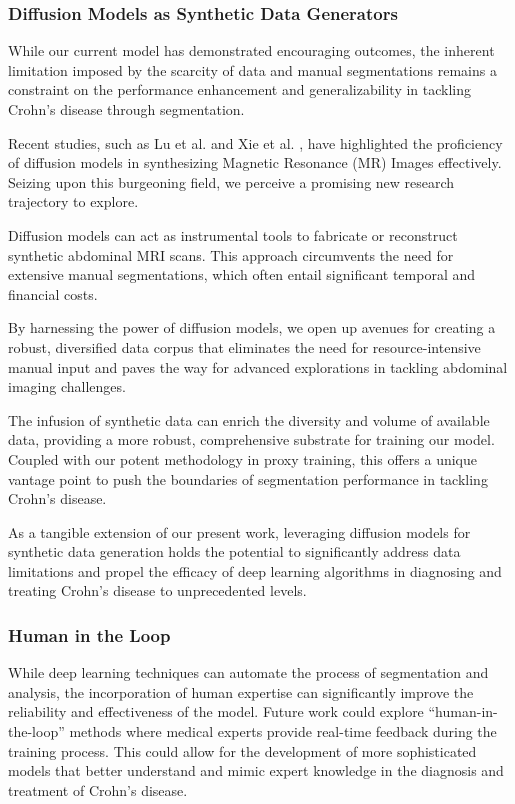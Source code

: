 \subsubsection*{Diffusion Models as Synthetic Data Generators}
While our current model has demonstrated encouraging outcomes, the inherent limitation imposed by the scarcity of data and manual segmentations remains a constraint on the performance enhancement and generalizability in tackling Crohn's disease through segmentation.

Recent studies, such as Lu et al. \cite{lu2023minddiffuser} and Xie et al. \cite{xie2023synthesizing}, have highlighted the proficiency of diffusion models in synthesizing Magnetic Resonance (MR) Images effectively. Seizing upon this burgeoning field, we perceive a promising new research trajectory to explore.

Diffusion models can act as instrumental tools to fabricate or reconstruct synthetic abdominal MRI scans. This approach circumvents the need for extensive manual segmentations, which often entail significant temporal and financial costs.

By harnessing the power of diffusion models, we open up avenues for creating a robust, diversified data corpus that eliminates the need for resource-intensive manual input and paves the way for advanced explorations in tackling abdominal imaging challenges.

The infusion of synthetic data can enrich the diversity and volume of available data, providing a more robust, comprehensive substrate for training our model. Coupled with our potent methodology in proxy training, this offers a unique vantage point to push the boundaries of segmentation performance in tackling Crohn's disease.

As a tangible extension of our present work, leveraging diffusion models for synthetic data generation holds the potential to significantly address data limitations and propel the efficacy of deep learning algorithms in diagnosing and treating Crohn's disease to unprecedented levels.

\subsubsection*{Human in the Loop}

While deep learning techniques can automate the process of segmentation and analysis, the incorporation of human expertise can significantly improve the reliability and effectiveness of the model. Future work could explore “human-in-the-loop” methods where medical experts provide real-time feedback during the training process. This could allow for the development of more sophisticated models that better understand and mimic expert knowledge in the diagnosis and treatment of Crohn's disease.

